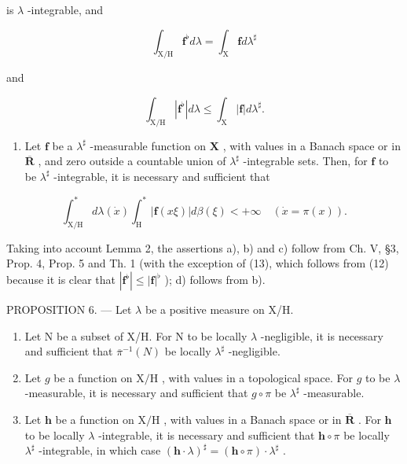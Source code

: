 is \(\lambda\) -integrable, and

\[
\int_ {\mathrm{X/H}} \mathbf {f} ^ {\flat} d \lambda = \int_ {\mathrm{X}} \mathbf {f} d \lambda^ {\sharp}\tag{12}
\]

and

\[
\int_ {\mathrm{X} / \mathrm{H}} | \mathbf {f} ^ {\flat} | d \lambda \leqslant \int_ {\mathrm{X}} | \mathbf {f} | d \lambda^ {\sharp}.\tag{13}
\]

\begin{enumerate}
\def\labelenumi{\alph{enumi})}
\setcounter{enumi}{3}
\tightlist
\item
  Let \(\mathbf{f}\) be a \(\lambda^{\sharp}\) -measurable function on \(\mathbf{X}\) , with values in a Banach space or in \(\overline{\mathbf{R}}\) , and zero outside a countable union of \(\lambda^{\sharp}\) -integrable sets. Then, for \(\mathbf{f}\) to be \(\lambda^{\sharp}\) -integrable, it is necessary and sufficient that
\end{enumerate}

\[
\int_ {\mathrm{X} / \mathrm{H}} ^ {*} d \lambda (\dot {x}) \int_ {\mathrm{H}} ^ {*} | \mathbf {f} (x \xi) | d \beta (\xi) <   + \infty \quad \left(\dot {x} = \pi (x)\right).
\]

Taking into account Lemma 2, the assertions a), b) and c) follow from Ch. V, §3, Prop. 4, Prop. 5 and Th. 1 (with the exception of (13), which follows from (12) because it is clear that \(|\mathbf{f}^{\flat}| \leqslant |\mathbf{f}|^{\flat}\) ); d) follows from b).

PROPOSITION 6. --- Let \(\lambda\) be a positive measure on X/H.

\begin{enumerate}
\def\labelenumi{\alph{enumi})}
\item
  Let N be a subset of X/H. For N to be locally \(\lambda\) -negligible, it is necessary and sufficient that \(\overline{\pi}^{-1}(N)\) be locally \(\lambda^{\sharp}\) -negligible.
\item
  Let \(g\) be a function on \(\mathrm{X / H}\) , with values in a topological space. For \(g\) to be \(\lambda\) -measurable, it is necessary and sufficient that \(g \circ \pi\) be \(\lambda^{\sharp}\) -measurable.
\item
  Let \(\mathbf{h}\) be a function on \(\mathrm{X / H}\) , with values in a Banach space or in \(\overline{\mathbf{R}}\) . For \(\mathbf{h}\) to be locally \(\lambda\) -integrable, it is necessary and sufficient that \(\mathbf{h} \circ \pi\) be locally \(\lambda^{\sharp}\) -integrable, in which case \((\mathbf{h} \cdot \lambda)^{\sharp} = (\mathbf{h} \circ \pi) \cdot \lambda^{\sharp}\) .
\end{enumerate}

